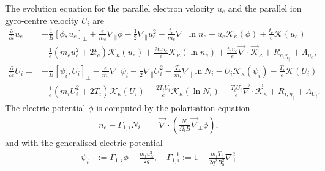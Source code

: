 The evolution equation for the parallel electron velocity \(u_e\) and the parallel ion gyro-centre velocity \(U_i\) are
\begin{align}
\frac{\partial}{\partial t}  u_e
      =&
      - \frac{1 }{ B} \left[ \phi, u_e  \right]_{\perp}
      +  \frac{e}{m_e}   \nabla_\parallel \phi
      -   \frac{1}{2}   \nabla_\parallel u_e^2
      - \frac{t_e}{m_e } \nabla_\parallel \ln  n_e
     - u_e   \mathcal{K}_{\kappa} \left( \phi  \right)
     + \frac{t_e}{e} \mathcal{K}\left(  u_e \right)
     \nonumber  \\    &
     + \frac{1}{e} \left(m_e  u_e^2 +  2  t_e\right)\mathcal{K}_{\kappa} \left(u_e\right)
    + \frac{2  t_e u_e }{ e} \mathcal{K}_{\kappa} \left(\ln n_e \right)
    + \frac{t_e  u_e }{e} \vec{\nabla} \cdot  \vec{\mathcal{K}}_{\kappa}
    + R_{e, \eta_\parallel}+\Lambda_{u_e} ,  \\
\frac{\partial}{\partial t}    U_i
      =&
      - \frac{1 }{ B} \left[ \psi_i, U_i  \right]_{\perp}
      -  \frac{e}{m_i}   \nabla_\parallel \psi_i
      -     \frac{1}{2}  \nabla_\parallel U_i^2
      - \frac{T_i}{m_i } \nabla_\parallel \ln  N_i
     -  U_i  \mathcal{K}_{\kappa} \left( \psi_i  \right)
     - \frac{T_i}{e} \mathcal{K}\left(  U_i \right)
     \nonumber  \\    &
           - \frac{1}{e}\left(m_i  U_i^2 + 2  T_i \right) \mathcal{K}_{\kappa} \left(U_i\right)
           - \frac{2  T_i U_i }{ e} \mathcal{K}_{\kappa} \left(\ln N_i \right)
           - \frac{T_i  U_i }{e} \vec{\nabla} \cdot  \vec{\mathcal{K}}_{\kappa}
         + R_{i,\eta_\parallel}  +\Lambda_{U_i}  .
\end{align}
The electric potential \(\phi\) is computed by the polarisation equation
\begin{align}
  n_e -\Gamma_{1,i} N_i &= \vec{\nabla} \cdot\left(\frac{N_i}{\Omega_i B} \vec{\nabla}_\perp \phi\right),
  \label{eq:polarisation_dimensional}
\end{align}
and with the generalised electric potential
\begin{align}
  \psi_i&:= \Gamma_{1,i} \phi - \frac{m_i u_E^2}{2 q}, \quad \Gamma_{1,i}^{-1} := 1-\frac{m_i T_i}{2q^2 B_0^2} \nabla_\perp^2
\end{align}

